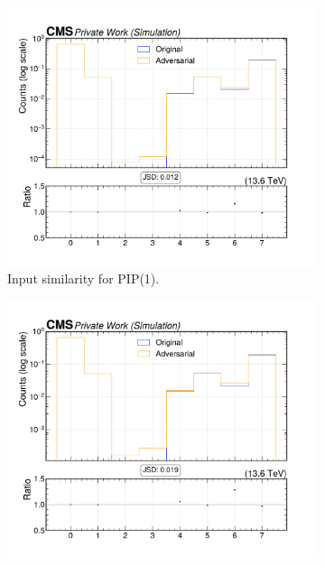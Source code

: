 \begin{figure}[htbp]
  \centering
  \begin{subfigure}[t]{0.32\textwidth}
    \includegraphics[width=\linewidth]{media/output/features/compare/intprob_1/cmp_cpf_arr_Cpfcan_VTX_ass.pdf}
    \caption{Input similarity for PIP(1).}
  \end{subfigure}\hfill
  \begin{subfigure}[t]{0.32\textwidth}
    \includegraphics[width=\linewidth]{media/output/features/compare/intprob_2/cmp_cpf_arr_Cpfcan_VTX_ass.pdf}

\end{subfigure}
\end{figure}
